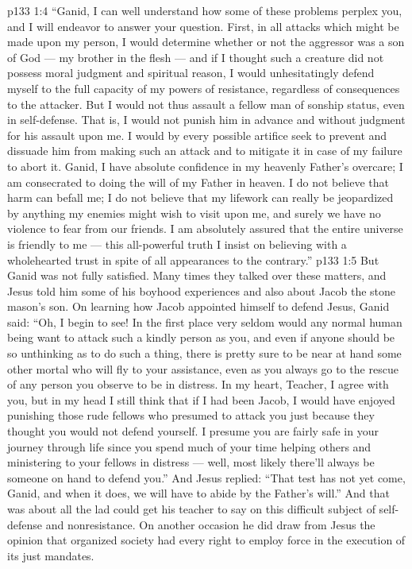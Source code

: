 \vs p133 1:4 \textcolor{ubdarkred}{“Ganid, I can well understand how some of these problems perplex you, and I will endeavor to answer your question. First, in all attacks which might be made upon my person, I would determine whether or not the aggressor was a son of God --- my brother in the flesh --- and if I thought such a creature did not possess moral judgment and spiritual reason, I would unhesitatingly defend myself to the full capacity of my powers of resistance, regardless of consequences to the attacker. But I would not thus assault a fellow man of sonship status, even in self\hyp{}defense. That is, I would not punish him in advance and without judgment for his assault upon me. I would by every possible artifice seek to prevent and dissuade him from making such an attack and to mitigate it in case of my failure to abort it. Ganid, I have absolute confidence in my heavenly Father’s overcare; I am consecrated to doing the will of my Father in heaven. I do not believe that  harm can befall me; I do not believe that my lifework can really be jeopardized by anything my enemies might wish to visit upon me, and surely we have no violence to fear from our friends. I am absolutely assured that the entire universe is friendly to me --- this all\hyp{}powerful truth I insist on believing with a wholehearted trust in spite of all appearances to the contrary.”}
\vs p133 1:5 But Ganid was not fully satisfied. Many times they talked over these matters, and Jesus told him some of his boyhood experiences and also about Jacob the stone mason’s son. On learning how Jacob appointed himself to defend Jesus, Ganid said: “Oh, I begin to see! In the first place very seldom would any normal human being want to attack such a kindly person as you, and even if anyone should be so unthinking as to do such a thing, there is pretty sure to be near at hand some other mortal who will fly to your assistance, even as you always go to the rescue of any person you observe to be in distress. In my heart, Teacher, I agree with you, but in my head I still think that if I had been Jacob, I would have enjoyed punishing those rude fellows who presumed to attack you just because they thought you would not defend yourself. I presume you are fairly safe in your journey through life since you spend much of your time helping others and ministering to your fellows in distress --- well, most likely there’ll always be someone on hand to defend you.” And Jesus replied: \textcolor{ubdarkred}{“That test has not yet come, Ganid, and when it does, we will have to abide by the Father’s will.”} And that was about all the lad could get his teacher to say on this difficult subject of self\hyp{}defense and nonresistance. On another occasion he did draw from Jesus the opinion that organized society had every right to employ force in the execution of its just mandates.
